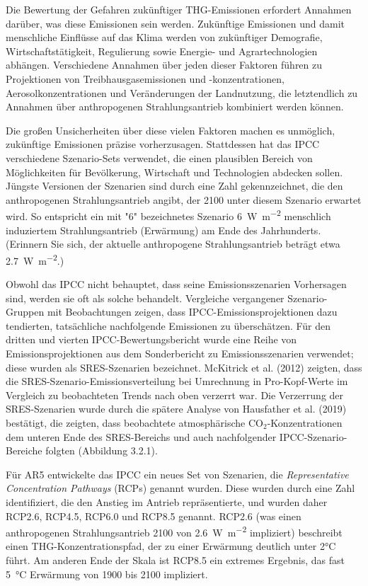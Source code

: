 \documentclass[12pt,paper=a4,DIV=12,parskip=never,chapterprefix=false,headings=standardclasses]{scrreprt}
\begin{document}
Die Bewertung der Gefahren zukünftiger THG-Emissionen erfordert Annahmen darüber, was diese Emissionen sein werden. Zukünftige Emissionen und damit menschliche Einflüsse auf das Klima werden von zukünftiger Demografie, Wirtschaftstätigkeit, Regulierung sowie Energie- und Agrartechnologien abhängen. Verschiedene Annahmen über jeden dieser Faktoren führen zu Projektionen von Treibhausgasemissionen und -konzentrationen, Aerosolkonzentrationen und Veränderungen der Landnutzung, die letztendlich zu Annahmen über anthropogenen Strahlungsantrieb kombiniert werden können.

Die großen Unsicherheiten über diese vielen Faktoren machen es unmöglich, zukünftige Emissionen präzise vorherzusagen. Stattdessen hat das IPCC verschiedene Szenario-Sets verwendet, die einen plausiblen Bereich von Möglichkeiten für Bevölkerung, Wirtschaft und Technologien abdecken sollen. Jüngste Versionen der Szenarien sind durch eine Zahl gekennzeichnet, die den anthropogenen Strahlungsantrieb angibt, der 2100 unter diesem Szenario erwartet wird. So entspricht ein mit "6" bezeichnetes Szenario \SI{6}{\watt\per\square\meter} menschlich induziertem Strahlungsantrieb (Erwärmung) am Ende des Jahrhunderts. (Erinnern Sie sich, der aktuelle anthropogene Strahlungsantrieb beträgt etwa \SI{2.7}{\watt\per\square\meter}.)

Obwohl das IPCC nicht behauptet, dass seine Emissionsszenarien Vorhersagen sind, werden sie oft als solche behandelt. Vergleiche vergangener Szenario-Gruppen mit Beobachtungen zeigen, dass IPCC-Emissionsprojektionen dazu tendierten, tatsächliche nachfolgende Emissionen zu überschätzen. Für den dritten und vierten IPCC-Bewertungsbericht wurde eine Reihe von Emissionsprojektionen aus dem Sonderbericht zu Emissionsszenarien verwendet; diese wurden als SRES-Szenarien bezeichnet. McKitrick et al. (2012) zeigten, dass die SRES-Szenario-Emissionsverteilung bei Umrechnung in Pro-Kopf-Werte im Vergleich zu beobachteten Trends nach oben verzerrt war. Die Verzerrung der SRES-Szenarien wurde durch die spätere Analyse von Hausfather et al. (2019) bestätigt, die zeigten, dass beobachtete atmosphärische CO$_2$-Konzentrationen dem unteren Ende des SRES-Bereichs und auch nachfolgender IPCC-Szenario-Bereiche folgten (Abbildung 3.2.1).

Für AR5 entwickelte das IPCC ein neues Set von Szenarien, die \emph{Representative Concentration Pathways} (RCPs) genannt wurden. Diese wurden durch eine Zahl identifiziert, die den Anstieg im Antrieb repräsentierte, und wurden daher RCP2.6, RCP4.5, RCP6.0 und RCP8.5 genannt. RCP2.6 (was einen anthropogenen Strahlungsantrieb 2100 von \SI{2.6}{\watt\per\square\meter} impliziert) beschreibt einen THG-Konzentrationspfad, der zu einer Erwärmung deutlich unter 2°C führt. Am anderen Ende der Skala ist RCP8.5 ein extremes Ergebnis, das fast \SI{5}{\celsius} Erwärmung von 1900 bis 2100 impliziert.
\end{document}

